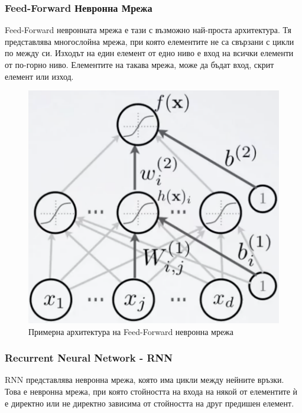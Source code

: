\documentclass{article}
\begin{document}
    \subsubsection{Feed-Forward Невронна Мрежа}

    Feed-Forward невронната мрежа е тази с възможно най-проста архитектура. Тя представлява многослойна мрежа, при която
    елементите не са свързани с цикли по между си. Изходът на един елемент от едно ниво е вход на всички елементи от
    по-горно ниво. Елементите на такава мрежа, може да бъдат вход, скрит елемент или изход. \cite{intro-to-nlp-stanford}

    \begin{figure}[H]
        \centering
        \captionsetup{justification=centering}
        \includegraphics[width=450px, keepaspectratio]{chapter-03/feed-forward.png}
        \caption{Примерна архитектура на Feed-Forward невронна мрежа}
    \end{figure}

    \subsubsection{Recurrent Neural Network - RNN}

    RNN представлява невронна мрежа, която има цикли между нейните връзки. Това е невронна мрежа, при която стойността на
    входа на някой от елементите ѝ е директно или не директно зависима от стойността на друг предишен елемент.
    \cite{intro-to-nlp-stanford}
\end{document}
